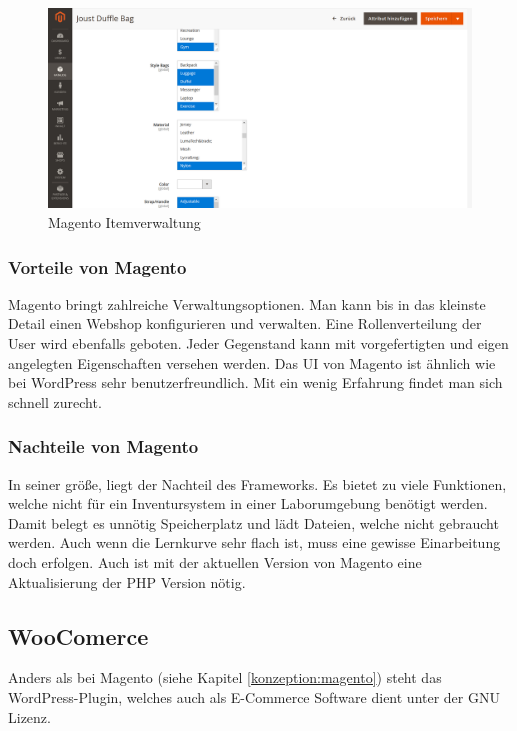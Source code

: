 \begin{figure}[H]
	\centering
	\includegraphics[scale=0.35]{content/pictures/magento.png}
	\caption{Magento Itemverwaltung}
	\label{fig:magento}
\end{figure}

\subsubsection{Vorteile von Magento}
Magento bringt zahlreiche Verwaltungsoptionen. Man kann bis in das kleinste Detail einen Webshop konfigurieren und verwalten. Eine Rollenverteilung der User wird ebenfalls geboten. Jeder Gegenstand kann mit vorgefertigten und eigen angelegten Eigenschaften versehen werden. Das \ac{UI} von Magento ist ähnlich wie bei WordPress sehr benutzerfreundlich. Mit ein wenig Erfahrung findet man sich schnell zurecht. \autocite{Koch.2012}

\subsubsection{Nachteile von Magento}
In seiner größe, liegt der Nachteil des Frameworks. Es bietet zu viele Funktionen, welche nicht für ein Inventursystem in einer Laborumgebung benötigt werden. Damit belegt es unnötig Speicherplatz und lädt Dateien, welche nicht gebraucht werden. Auch wenn die Lernkurve sehr flach ist, muss eine gewisse Einarbeitung doch erfolgen. Auch ist mit der aktuellen Version von Magento eine Aktualisierung der \ac{PHP} Version nötig. \autocite{Koch.2012}

\subsection{WooComerce}
Anders als bei Magento (siehe Kapitel \ref{konzeption:magento}) steht das WordPress-Plugin, welches auch als E-Commerce Software dient unter der \ac{GNU} Lizenz. 

